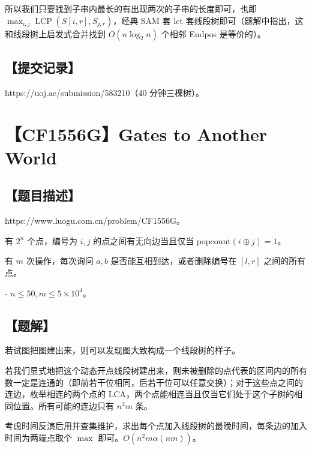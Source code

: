 \documentclass[UTF8,12pt,a4paper]{ctexart}
\begin{document}
	所以我们只要找到子串内最长的有出现两次的子串的长度即可，也即 $\max_{i,j} \operatorname{LCP}\left( S[i,r],S_{j,r} \right)$，经典 SAM 套 lct 套线段树即可（题解中指出，这和线段树上启发式合并找到 $O(n\log_2n)$ 个相邻 Endpos 是等价的）。
	
	
	\subsection*{【提交记录】}
	
	https://uoj.ac/submission/583210（40 分钟三棵树）。
	
	
	\section*{【CF1556G】Gates to Another World}
	
	\subsection*{【题目描述】}
	
	https://www.luogu.com.cn/problem/CF1556G。
	
	有 $2^n$ 个点，编号为 $i,j$ 的点之间有无向边当且仅当 $\mathrm{popcount}(i \oplus j)=1$。  
	
	有 $m$ 次操作，每次询问 $a,b$ 是否能互相到达，或者删除编号在 $[l,r]$ 之间的所有点。  
	
	- $n \le 50,m \le 5 \times 10^4$。
	
	\subsection*{【题解】}
	
	若试图把图建出来，则可以发现图大致构成一个线段树的样子。
	
	若我们显式地把这个动态开点线段树建出来，则未被删除的点代表的区间内的所有数一定是连通的（即前若干位相同，后若干位可以任意交换）；对于这些点之间的连边，枚举相连的两个点的 LCA，两个点能相连当且仅当它们处于这个子树的相同位置。所有可能的连边只有 $n^2m$ 条。
	
	考虑时间反演后用并查集维护，求出每个点加入线段树的最晚时间，每条边的加入时间为两端点取个 $\max$ 即可。$O(n^2m\alpha(nm))$。	
	
\end{document}
